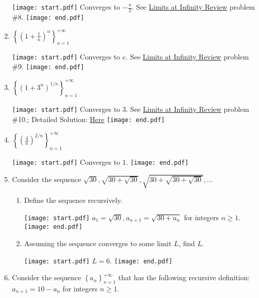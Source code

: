 \documentclass[12pt]{article}
\begin{document}
\begin{enumerate}
\texttt{[image: start.pdf]}
{{Converges to $-\frac{\pi}{2}$.  See \underline{Limits at Infinity Review} problem \#8.}}
\texttt{[image: end.pdf]}


\item $\left\{ \left(1+\frac{1}{n}\right)^n \right\}_{n = 1}^{+\infty}$

\texttt{[image: start.pdf]}
{{Converges to $e$.  See \underline{Limits at Infinity Review} problem \#9.}}
\texttt{[image: end.pdf]}


\item $\left\{ \left(1+3^n\right)^{1/n} \right\}_{n = 1}^{+\infty}$

\texttt{[image: start.pdf]}
{{Converges to $3$.  See \underline{Limits at Infinity Review} problem \#10.; Detailed Solution: \textcolor{blue}{\href{http://www.math.drexel.edu/classes/Calculus/resources/Math123HW/Solutions/123_05_Sequences_35.pdf}{Here}}}}
\texttt{[image: end.pdf]}



\item $\left\{ \left(\frac{4}{n}\right)^{2/n} \right\}_{n = 1}^{+\infty}$

\texttt{[image: start.pdf]}
{{Converges to $1$.}}
\texttt{[image: end.pdf]}


\item Consider the sequence $\sqrt{30}, \sqrt{30+\sqrt{30}}, \sqrt{30+\sqrt{30+\sqrt{30}}}, ...$

\begin{enumerate}

\item Define the sequence recursively.

\texttt{[image: start.pdf]}
{{$a_1=\sqrt{30}, a_{n+1}=\sqrt{30+a_n}$ for integers $n\geq1$.}}
\texttt{[image: end.pdf]}


\item Assuming the sequence converges to some limit $L$, find $L$.

\texttt{[image: start.pdf]}
{{$L=6$.}}
\texttt{[image: end.pdf]}


\end{enumerate}

\item Consider the sequence $\left\{ a_n \right\}_{n = 1}^{+\infty}$ that has the following recursive definition: \newline $a_{n+1}=10-a_n$ for integers $n\geq1$.


\end{enumerate}
\end{document}
